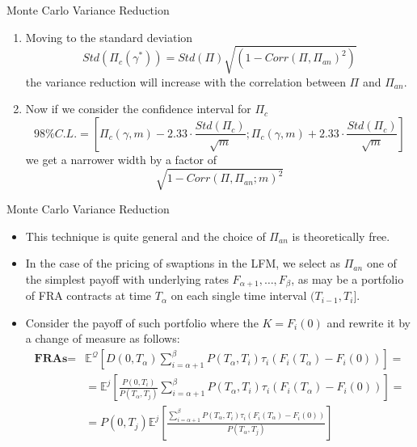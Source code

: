 \documentclass{beamer}
\begin{document}
\begin{frame}{Monte Carlo Variance Reduction}
	\begin{enumerate}\addtocounter{enumi}{3}
  \item<1-> Moving to the standard deviation
	\begin{equation*}
		Std(\Pi_c(\gamma^*)) = Std(\Pi) \sqrt{(1 - Corr(\Pi, \Pi_{an})^2)}
	\end{equation*}
	the variance reduction will increase with the correlation between $\Pi$ and $\Pi_{an}$. 
	\item<2-> Now if we consider the confidence interval for $\Pi_c$ 
	\begin{equation*}
		98\% C.L. =\left[\Pi_c(\gamma,m) - 2.33\cdot\frac{Std(\Pi_c)}{\sqrt{m}};\Pi_c(\gamma,m) + 2.33\cdot\frac{Std(\Pi_c)}{\sqrt{m}}\right] 
	\end{equation*}
	we get a narrower width by a factor of
	\begin{equation*}
		\sqrt{1 - Corr(\Pi, \Pi_{an}; m)^2}
	\end{equation*}
	\end{enumerate}
\end{frame}

\begin{frame}{Monte Carlo Variance Reduction}
  \begin{itemize}
  \item<1-> This technique is quite general and the choice of $\Pi_{an}$ is theoretically free.
  \item<2-> In the case of the pricing of swaptions in the LFM, we select as $\Pi_{an}$ one of the simplest payoff with underlying rates $F_{\alpha+1},\ldots,F_\beta$, as may be a portfolio of FRA contracts at time $T_\alpha$ on each single time interval $(T_{i-1}, T_i]$.
  \item<3-> Consider the payoff of such portfolio where the $K = F_i(0)$ and rewrite it by a change of measure as follows:
    \begin{equation*}
      \begin{aligned}
        \textbf{FRAs} = &\mathbb{E}^\mathcal{Q}\left[D(0,T_\alpha)\sum_{i=\alpha+1}^\beta P(T_\alpha,T_i)\tau_i(F_i(T_\alpha) - F_i(0))\right] = \\
        &=\mathbb{E}^j\left[\frac{P(0,T_i)}{P(T_\alpha,T_j)}\sum_{i=\alpha+1}^\beta P(T_\alpha,T_i)\tau_i(F_i(T_\alpha) - F_i(0))\right] = \\
        & = P(0,T_j)\mathbb{E}^j\left[\frac{\sum_{i=\alpha+1}^\beta P(T_\alpha,T_i)\tau_i(F_i(T_\alpha) - F_i(0))}{P(T_\alpha,T_j)}\right]
      \end{aligned}
    \end{equation*}
  \end{itemize}
\end{frame}
\end{document}
